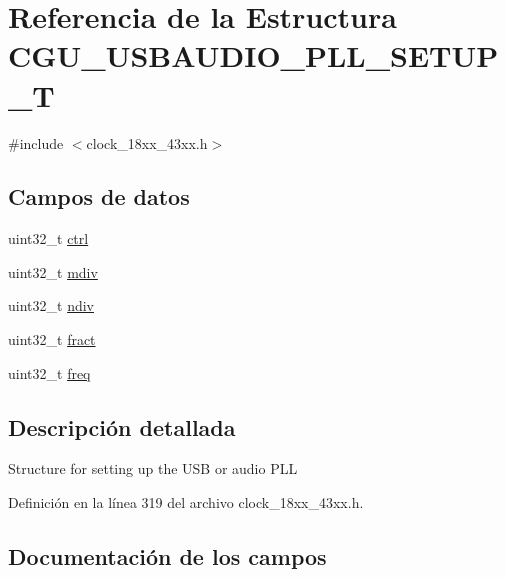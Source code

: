 \hypertarget{struct_c_g_u___u_s_b_a_u_d_i_o___p_l_l___s_e_t_u_p___t}{}\section{Referencia de la Estructura C\+G\+U\+\_\+\+U\+S\+B\+A\+U\+D\+I\+O\+\_\+\+P\+L\+L\+\_\+\+S\+E\+T\+U\+P\+\_\+T}
\label{struct_c_g_u___u_s_b_a_u_d_i_o___p_l_l___s_e_t_u_p___t}


{\ttfamily \#include $<$clock\+\_\+18xx\+\_\+43xx.\+h$>$}

\subsection*{Campos de datos}
\begin{DoxyCompactItemize}
\item 
uint32\+\_\+t \hyperlink{struct_c_g_u___u_s_b_a_u_d_i_o___p_l_l___s_e_t_u_p___t_a6b78d29adca390bd7470d86e41a59077}{ctrl}
\item 
uint32\+\_\+t \hyperlink{struct_c_g_u___u_s_b_a_u_d_i_o___p_l_l___s_e_t_u_p___t_ab8004496d39107a08ec9f804215bd2fb}{mdiv}
\item 
uint32\+\_\+t \hyperlink{struct_c_g_u___u_s_b_a_u_d_i_o___p_l_l___s_e_t_u_p___t_a6ab478553237b23124331747601b932e}{ndiv}
\item 
uint32\+\_\+t \hyperlink{struct_c_g_u___u_s_b_a_u_d_i_o___p_l_l___s_e_t_u_p___t_aed5ecd37a93f7eb5f458ddd33eb27843}{fract}
\item 
uint32\+\_\+t \hyperlink{struct_c_g_u___u_s_b_a_u_d_i_o___p_l_l___s_e_t_u_p___t_aacfad457f5366fa9265eb0a89e43f23b}{freq}
\end{DoxyCompactItemize}


\subsection{Descripción detallada}
Structure for setting up the U\+SB or audio P\+LL 

Definición en la línea 319 del archivo clock\+\_\+18xx\+\_\+43xx.\+h.



\subsection{Documentación de los campos}
